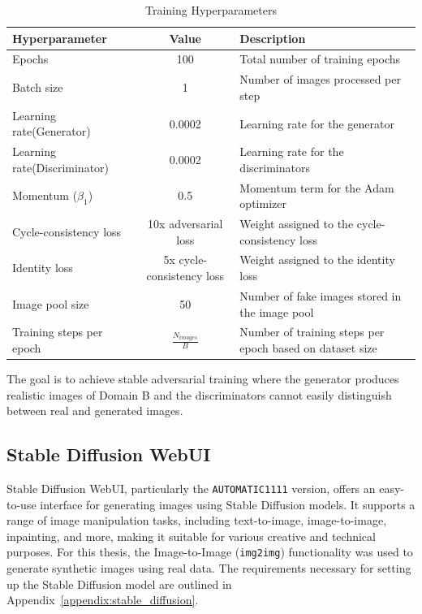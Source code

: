 \documentclass[12pt,DIV14,BCOR12mm,a4paper,footinclude=false,headinclude,parskip=half-,twoside,openright,cleardoublepage=empty,toc=index,bibliography=totoc,listof=totoc]{scrreprt}
\numberwithin{equation}{chapter}
\begin{document}
\begin{table}
    \centering
    \caption{Training Hyperparameters}
    \label{tab:hyperparameters}
    \begin{tabularx}{\textwidth}{XcX} %
        \toprule
        \textbf{Hyperparameter} & \textbf{Value} & \textbf{Description} \\ 
        \midrule
        Epochs & 100 & Total number of training epochs \\ 
        Batch size & 1 & Number of images processed per step \\
        Learning rate(Generator) & 0.0002 & Learning rate for the generator \\
        Learning rate(Discriminator) & 0.0002 & Learning rate for the discriminators \\
        Momentum (\( \beta_1 \)) & 0.5 & Momentum term for the Adam optimizer \\
        Cycle-consistency loss & 10x adversarial loss & Weight assigned to the cycle-consistency loss \\
        Identity loss & 5x cycle-consistency loss & Weight assigned to the identity loss \\
        Image pool size & 50 & Number of fake images stored in the image pool \\
        Training steps per epoch & \( \frac{N_{images}}{B} \) & Number of training steps per epoch based on dataset size \\ 
        \bottomrule
    \end{tabularx}
\end{table}

The goal is to achieve stable adversarial training where the generator produces realistic images of Domain B and the discriminators cannot easily distinguish between real and generated images.

\subsection{Stable Diffusion WebUI}
\label{sec:stable_diffusion}

Stable Diffusion WebUI, particularly the \texttt{AUTOMATIC1111} version, offers an easy-to-use interface for generating images using Stable Diffusion models. It supports a range of image manipulation tasks, including text-to-image, image-to-image, inpainting, and more, making it suitable for various creative and technical purposes. For this thesis, the Image-to-Image (\texttt{img2img}) functionality was used to generate synthetic images using real data. The requirements necessary for setting up the Stable Diffusion model are outlined in Appendix~\ref{appendix:stable_diffusion}.
\end{document}
